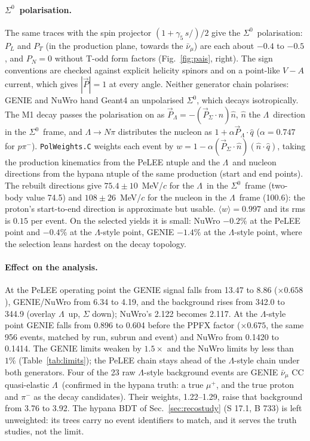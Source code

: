 \documentclass[11pt,a4paper]{article}
\newcommand{\Szero}{\ensuremath{\Sigma^{0}}}
\newcommand{\Lam}{\ensuremath{\Lambda}}
\newcommand{\numubar}{\ensuremath{\bar{\nu}_\mu}}
\begin{document}
\paragraph{\Szero\ polarisation.} The same traces with the spin projector
$(1+\gamma_5\,s\!\!\!/)/2$ give the \Szero\ polarisation: $P_L$ and $P_T$ (in the
production plane, towards the $\numubar$) are each about $-0.4$ to $-0.5$, and $P_N=0$
without T-odd form factors (Fig.~\ref{fig:pais}, right). The sign conventions are
checked against explicit helicity spinors and on a point-like $V-A$ current, which
gives $|\vec P|=1$ at every angle. Neither generator chain polarises: GENIE and NuWro
hand Geant4 an unpolarised \Szero, which decays isotropically. The M1 decay passes the
polarisation on as $\vec P_\Lam=-(\vec P_\Sigma\cdot\hat n)\hat n$, $\hat n$ the \Lam\
direction in the \Szero\ frame, and $\Lam\to N\pi$ distributes the nucleon as
$1+\alpha\vec P_\Lam\cdot\hat q$ ($\alpha=0.747$ for $p\pi^-$). \texttt{PolWeights.C}
weights each event by $w=1-\alpha(\vec P_\Sigma\cdot\hat n)(\hat n\cdot\hat q)$, taking
the production kinematics from the PeLEE ntuple and the \Lam\ and nucleon directions
from the hypana ntuple of the same production (start and end points). The rebuilt
directions give $75.4\pm10$~MeV/$c$ for the \Lam\ in the \Szero\ frame (two-body value
74.5) and $108\pm26$~MeV/$c$ for the nucleon in the \Lam\ frame (100.6): the proton's
start-to-end direction is approximate but usable. $\langle w\rangle=0.997$ and its rms
is $0.15$ per event. On the selected yields it is small: NuWro $-0.2\%$ at the PeLEE
point and $-0.4\%$ at the \Lam-style point, GENIE $-1.4\%$ at the \Lam-style point, where the
selection leans hardest on the decay topology.

\paragraph{Effect on the analysis.} At the PeLEE operating point the GENIE signal falls
from 13.47 to 8.86 ($\times0.658$), GENIE/NuWro from 6.34 to 4.19, and the background
rises from 342.0 to 344.9 (overlay \Lam\ up, $\Sigma$ down); NuWro's 2.122 becomes 2.117. At
the \Lam-style point GENIE falls from 0.896 to 0.604 before the PPFX factor ($\times0.675$,
the same 956 events, matched by run, subrun and event) and NuWro from 0.1420 to 0.1414.
The GENIE limits weaken by $1.5\times$ and the NuWro limits by less than $1\%$
(Table~\ref{tab:limits}); the PeLEE chain stays ahead of the \Lam-style chain under both
generators. Four of the 23 raw \Lam-style background events are GENIE $\numubar$ CC
quasi-elastic \Lam\ (confirmed in the hypana truth: a true $\mu^+$, and the true proton and
$\pi^-$ as the decay candidates). Their weights, 1.22--1.29, raise that background from 3.76
to 3.92. The hypana BDT of Sec.~\ref{sec:recostudy} (S 17.1, B 733) is left unweighted: its
trees carry no event identifiers to match, and it serves the truth studies, not the limit.
\end{document}

